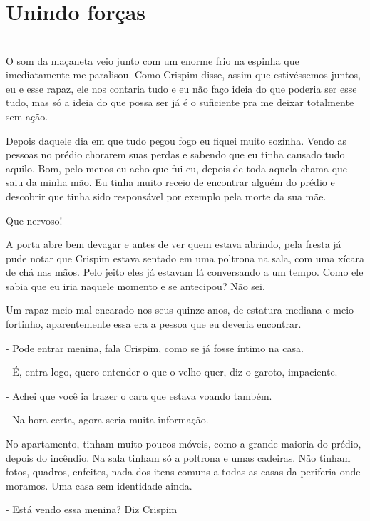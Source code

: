 \newpage


\ifdefined\useChapters
\chapter{Unindo forças}
\else
\chapter{}
\fi
O som da maçaneta veio junto com um enorme frio na espinha que imediatamente me paralisou. Como Crispim disse, assim que estivéssemos juntos, eu e esse rapaz, ele nos contaria tudo e eu não faço ideia do que poderia ser esse tudo, mas só a ideia do que possa ser já é o suficiente pra me deixar totalmente sem ação.

Depois daquele dia em que tudo pegou fogo eu fiquei muito sozinha. Vendo as pessoas no prédio chorarem suas perdas e sabendo que eu tinha causado tudo aquilo. Bom, pelo menos eu acho que fui eu, depois de toda aquela chama que saiu da minha mão. Eu tinha muito receio de encontrar alguém do prédio e descobrir que tinha sido responsável por exemplo pela morte da sua mãe.

Que nervoso!

A porta abre bem devagar e antes de ver quem estava abrindo, pela fresta já pude notar que Crispim estava sentado em uma poltrona na sala, com uma xícara de chá nas mãos. Pelo jeito eles já estavam lá conversando a um tempo. Como ele sabia que eu iria naquele momento e se antecipou? Não sei.

Um rapaz meio mal-encarado nos seus quinze anos, de estatura mediana e meio fortinho, aparentemente essa era a pessoa que eu deveria encontrar.

- Pode entrar menina, fala Crispim, como se já fosse íntimo na casa.

- É, entra logo, quero entender o que o velho quer, diz o garoto, impaciente.

- Achei que você ia trazer o cara que estava voando também.

- Na hora certa, agora seria muita informação.

No apartamento, tinham muito poucos móveis, como a grande maioria do prédio, depois do incêndio. Na sala tinham só a poltrona e umas cadeiras. Não tinham fotos, quadros, enfeites, nada dos itens comuns a todas as casas da periferia onde moramos. Uma casa sem identidade ainda.

- Está vendo essa menina? Diz Crispim

